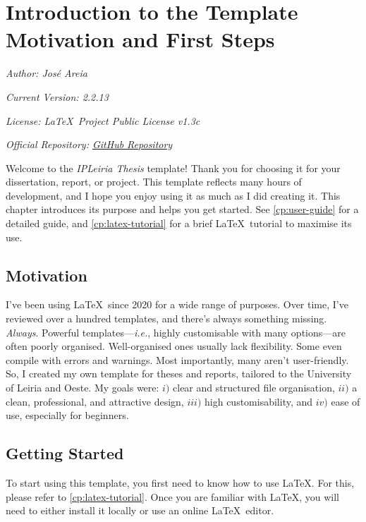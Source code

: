 \chapter[Introduction to the Template: Motivation and First Steps]{Introduction to the Template Motivation and First Steps}
\label{cp:introduction}

{
\parindent0pt

\textit{Author: José Areia}

\textit{Current Version: 2.2.13}

\textit{License: \LaTeX~Project Public License v1.3c}

\textit{Official Repository: \href{https://github.com/joseareia/ipleiria-thesis}{GitHub Repository}}

\vspace{.935em}

Welcome to the \textcolor{maincolor}{\textit{IPLeiria Thesis}} template! Thank you for choosing it for your dissertation, report, or project. This template reflects many hours of development, and I hope you enjoy using it as much as I did creating it. This chapter introduces its purpose and helps you get started. See \autoref{cp:user-guide} for a detailed guide, and \autoref{cp:latex-tutorial} for a brief \LaTeX~tutorial to maximise its use.
}

\section{Motivation}
I've been using \LaTeX~since 2020 for a wide range of purposes. Over time, I've reviewed over a hundred templates, and there's always something missing. \textit{Always}. Powerful templates---\textit{i.e.}, highly customisable with many options---are often poorly organised. Well-organised ones usually lack flexibility. Some even compile with errors and warnings. Most importantly, many aren't user-friendly. So, I created my own template for theses and reports, tailored to the University of Leiria and Oeste. My goals were: \(i)\) clear and structured file organisation, \(ii)\) a clean, professional, and attractive design, \(iii)\) high customisability, and \(iv)\) ease of use, especially for beginners.


\section{Getting Started}
To start using this template, you first need to know how to use \LaTeX. For this, please refer to \autoref{cp:latex-tutorial}. Once you are familiar with \LaTeX, you will need to either install it locally or use an online \LaTeX~editor.


